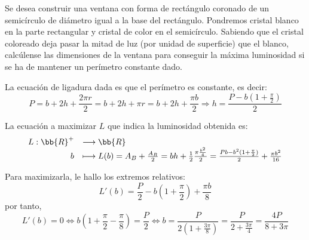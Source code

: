 \begin{ejercicio}
    Se desea construir una ventana con forma de rectángulo coronado de un semicírculo de diámetro igual a la base del rectángulo. Pondremos cristal blanco en la parte rectangular y cristal de color en el semicírculo. Sabiendo que el cristal coloreado deja pasar la mitad de luz (por unidad de superficie) que el blanco, calcúlense las dimensiones de la ventana para conseguir la máxima luminosidad si se ha de mantener un perímetro constante dado.
    \begin{figure}[H]
        \centering
    \end{figure}

    La ecuación de ligadura dada es que el perímetro es constante, es decir:
    $$P=b+2h+\frac{2\pi r}{2} = b+2h+\pi r = b+2h + \frac{\pi b}{2} \Longrightarrow h = \frac{P-b(1+\frac{\pi}{2})}{2}$$

    La ecuación a maximizar $L$ que indica la luminosidad obtenida es:
    \begin{equation*}
        \begin{array}{rl}
            L:\bb{R}^+ & \longrightarrow \bb{R}\\
                    b & \longmapsto L(b) = A_B + \frac{A_R}{2} = bh +  \frac{1}{2} \frac{\pi \frac{b^2}{4}}{2}
                    = \frac{Pb-b^2(1+\frac{\pi}{2})}{2} + \frac{\pi b^2}{16} 
        \end{array}
    \end{equation*}

    Para maximizarla, le hallo los extremos relativos:
    \begin{equation*}
        L'(b) = \frac{P}{2} - b\left(1+\frac{\pi}{2}\right) + \frac{\pi b}{8}
    \end{equation*}
    por tanto,
    \begin{equation*}
        L'(b) = 0 \Longleftrightarrow b\left(1+\frac{\pi}{2} - \frac{\pi}{8}\right) = \frac{P}{2} \Longleftrightarrow b = \frac{P}{2\left(1+\frac{3\pi}{8}\right)} = \frac{P}{2+\frac{3\pi}{4}} = \frac{4 P}{8+3\pi}
    \end{equation*}


\end{ejercicio}
